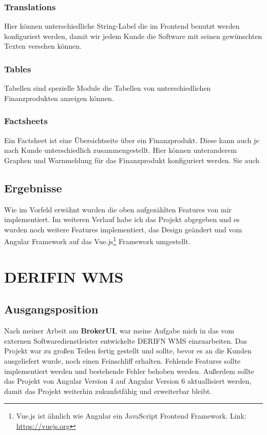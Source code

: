 \documentclass[chapterprefix=false, 12pt, a4paper, oneside, parskip=half, listof=totoc, bibliography=totoc, numbers=noendperiod]{scrbook}
\begin{document}
    \subsubsection{Translations}

    Hier können unterschiedliche String-Label die im Frontend benutzt werden konfiguriert werden, damit wir jedem Kunde
    die Software mit seinen gewünschten Texten versehen können.

    \subsubsection{Tables}

    Tabellen sind spezielle Module die Tabellen von unterschiedlichen Finanzprodukten anzeigen können.

    \subsubsection{Factsheets}

    Ein Factsheet ist eine Übersichtseite über ein Finanzprodukt. Diese kann auch je nach Kunde unterschiedlich zusammengestellt.
    Hier können unteranderem Graphen und Warnmeldung für das Finanzprodukt konfiguriert werden. Sie auch

    \subsection{Ergebnisse}

    Wie im Vorfeld erwähnt wurden die oben aufgezählten Features von mir implementiert. Im weiteren Verlauf habe ich das Projekt
    abgegeben und es wurden noch weitere Features implementiert, das Design geändert und vom Angular Framework
    auf das Vue.js\footnote{Vue.js ist ähnlich wie Angular ein JavaScript Frontend Framework. Link: \url{https://vuejs.org}}
    Framework umgestellt.

    \section{DERIFIN WMS}

    \subsection{Ausgangsposition}

    Nach meiner Arbeit am \textbf{BrokerUI}, war meine Aufgabe mich in das vom externen Softwaredienstleister
    entwickelte DERIFN WMS einzuarbeiten. Das Projekt war zu großen Teilen fertig gestellt und sollte, bevor es an die
    Kunden ausgeliefert wurde, noch einen Feinschliff erhalten. Fehlende Features sollte implementiert werden und bestehende
    Fehler behoben werden. Außerdem sollte das Projekt von Angular Version 4 auf Angular Version 6 aktuallisiert werden, damit
    das Projekt weiterhin zukunfstfähig und erweiterbar bleibt.
\end{document}
